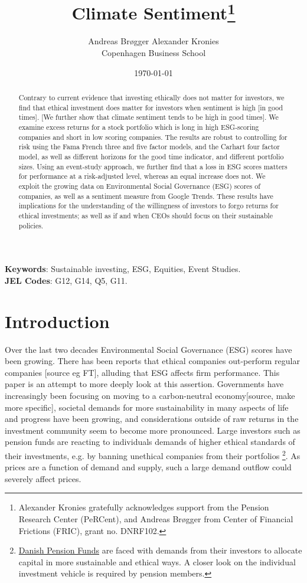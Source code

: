 \documentclass[11pt]{article}
\title{\Huge Climate Sentiment\thanks{Alexander Kronies gratefully acknowledges support from the Pension Research Center (PeRCent), and Andreas Br\o gger 
from Center of Financial Frictions (FRIC), grant no. DNRF102.}} %
\author{Andreas Br\o gger \hspace{3em} Alexander Kronies \\Copenhagen Business School
}
\date{\today}         %
\begin{document}
\maketitle
\thispagestyle{empty} %

\begin{abstract}

\noindent Contrary to current evidence that investing ethically does not matter for investors, we find that ethical investment does matter for investors when sentiment is high [in good times]. [We further show that climate sentiment tends to be high in good times]. We examine excess returns for a stock portfolio which is long in high ESG-scoring companies and short in low scoring companies. The results are robust to controlling for risk using the Fama French three and five factor models, and the Carhart four factor model, as well as different horizons for the good time indicator, and different portfolio sizes. Using an event-study approach, we further find that a loss in ESG scores matters for performance at a risk-adjusted level, whereas an equal increase does not. We exploit the growing data on Environmental Social Governance (ESG) scores of companies, as well as a sentiment measure from Google Trends.  These results have implications for the understanding of the willingness of investors to forgo returns for ethical investments; as well as if and when CEOs should focus on their sustainable policies.
\end{abstract}

\noindent \textbf{Keywords}: Sustainable investing, ESG, Equities, Event Studies.\\
\noindent \textbf{JEL Codes}: G12, G14, Q5, G11.

\clearpage
\setcounter{footnote}{0}
\renewcommand{\thefootnote}{\arabic{footnote}}
\setcounter{page}{1}


\section{Introduction}
Over the last two decades Environmental Social Governance (ESG) scores have been growing. There has been reports that ethical companies out-perform regular companies [source eg FT], alluding that ESG affects firm performance. This paper is an attempt to more deeply look at this assertion. Governments have increasingly been focusing on moving to a carbon-neutral economy[source, make more specific], societal demands for more sustainability in many aspects of life and progress have been growing, and considerations outside of raw returns in the investment community seem to become more pronounced. Large investors such as pension funds are reacting to individuals demands of higher ethical standards of their investments, e.g. by banning unethical companies from their portfolios \footnote{\href{https://www.dr.dk/nyheder/indland/pensionskasser-vil-afvise-selskaber-med-daarlig-skattemoral}{Danish Pension Funds} are faced with demands from their investors to allocate capital in more sustainable and ethical ways. A closer look on the individual investment vehicle is required by pension members.}. As prices are a function of demand and supply, such a large demand outflow could severely affect prices.
\end{document}
